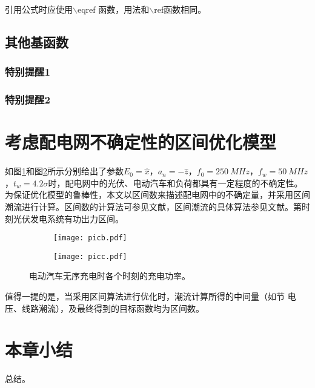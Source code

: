 引用公式时应使用$\backslash$eqref 函数，用法和$\backslash$ref函数相同。

\subsection{其他基函数}

\subsubsection{特别提醒1}

\subsubsection{特别提醒2}

\section{考虑配电网不确定性的区间优化模型}

如图\ref{picb}和图\ref{picc}所示分别给出了参数$E_0=\hat{x}$，$a_n=-\hat{z}$，$f_0=\SI{250}{MHz}$，$f_w=\SI{50}{MHz}$，$t_w=4.2\sigma$时，配电网中的光伏、电动汽车和负荷都具有一定程度的不确定性。为保证优化模型的鲁棒性，本文以区间数来描述配电网中的不确定量，并采用区间潮流进行计算。区间数的计算法可参见文献，区间潮流的具体算法参见文献。第时刻光伏发电系统有功出力区间。

\begin{figure}[h]
	\begin{subfigure}[b]{0.49\linewidth}
		\texttt{[image: picb.pdf]}
		\label{picb}
    \end{subfigure}
	\begin{subfigure}[b]{0.49\linewidth}
		\texttt{[image: picc.pdf]}
		\label{picc}
    \end{subfigure}
	\caption{电动汽车无序充电时各个时刻的充电功率。}
	\label{fig1}
\end{figure}

值得一提的是，当采用区间算法进行优化时，潮流计算所得的中间量（如节 电压、线路潮流），及最终得到的目标函数均为区间数。

\section{本章小结}
总结。
